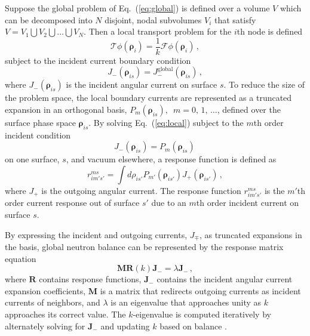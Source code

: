 \documentclass[5p,times,twocolumn,10pt]{elsarticle}
\newcommand{\EQ}[1]{Eq.~(\ref{#1})}               %
\begin{document}
Suppose the global problem of \EQ{eq:global} is defined over a 
volume $V$ which can be decomposed into $N$ disjoint, nodal subvolumes
$V_i$ that satisfy $V = V_1 \bigcup V_2 \bigcup \ldots \bigcup V_N$.
Then a local transport problem for the $i$th node is defined
\begin{equation}
  \mathcal{T} \phi(\bm{\rho}_i) = 
    \frac{1}{k} \mathcal{F} \phi(\bm{\rho}_i) \, ,
  \label{eq:local}
\end{equation}
subject to the incident current boundary condition
\begin{equation}
  J^{\mathrm{}}_{-} (\bm{\rho}_{is}) = 
    J^{\mathrm{global}}_{-}(\bm{\rho}_{is}) \, ,
  \label{eq:localbc}
\end{equation}   
where $J_{-} (\bm{\rho}_{is}) $ is the incident angular current on 
surface $s$.  To reduce the size of the problem space, the local boundary 
currents are represented as a truncated 
expansion in an 
orthogonal basis, $P_m(\bm{\rho}_{is}), \,\,\, m = 0, \, 1, \, \ldots$,
defined over the surface phase space $\bm{\rho}_{is}$.
By solving \EQ{eq:local} subject to the $m$th order 
incident condition
\begin{equation}
 J_{-} (\bm{\rho}_{is}) = P_m(\bm{\rho}_{is}) \, 
\end{equation}
on one surface, $s$, and vacuum elsewhere, 
a response function is defined as
\begin{equation}
       r^{ms}_{im's'} = \int d\rho_{is'} P_{m'}(\bm{\rho}_{is'})  
        J_{+} (\bm{\rho}_{is'}) \, ,
\label{eq:responsefunction}
\end{equation}
where $J_+$ is the outgoing angular current.  The 
response function $r^{ms}_{im's'}$ 
is the $m'$th order current response out of 
surface $s'$ due to an $m$th order incident current on 
surface $s$.

By expressing the incident and outgoing currents, $J_{\mp}$, as truncated  
expansions in the basis, global neutron balance can be represented by the 
response matrix equation 
\begin{equation}
  \mathbf{M}\mathbf{R}(k)\mathbf{J_-}  = \lambda \mathbf{J_-} \, ,
\label{eq:erme}
\end{equation}
where $\mathbf{R}$ contains response functions, $\mathbf{J}_{-}$ contains the  
incident angular current expansion coefficients, $\mathbf{M}$ is a matrix that 
redirects outgoing currents as incident currents of neighbors, and $\lambda$ is 
an eigenvalue that approaches unity as $k$ approaches its correct value. The 
$k$-eigenvalue is computed iteratively by alternately solving for 
$\mathbf{J}_{-}$ and updating $k$ based on balance \cite{RobertsSerment}.
\end{document}
